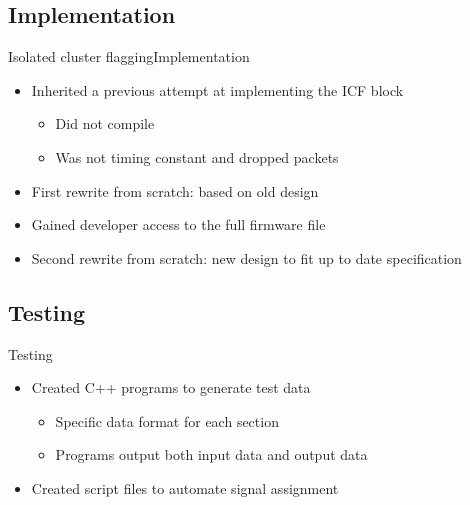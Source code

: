 \documentclass{beamer}
\begin{document}
\subsection{Implementation}
\begin{frame}{Isolated cluster flagging}{Implementation}
  \begin{itemize}
    \item
      Inherited a previous attempt at implementing the ICF block
      \begin{itemize}
        \item Did not compile
        \item Was not timing constant and dropped packets
      \end{itemize}
    \item
      First rewrite from scratch: based on old design
    \item
      Gained developer access to the full firmware file
    \item
      Second rewrite from scratch: new design to fit up to date specification
  \end{itemize}
\end{frame}

\subsection{Testing}
\begin{frame}{Testing}
  \begin{itemize}
    \item
      Created C++ programs to generate test data
      \begin{itemize}
        \item Specific data format for each section
        \item Programs output both input data and output data
      \end{itemize}

    \item
      Created script files to automate signal assignment
  \end{itemize}
\end{frame}
\end{document}
